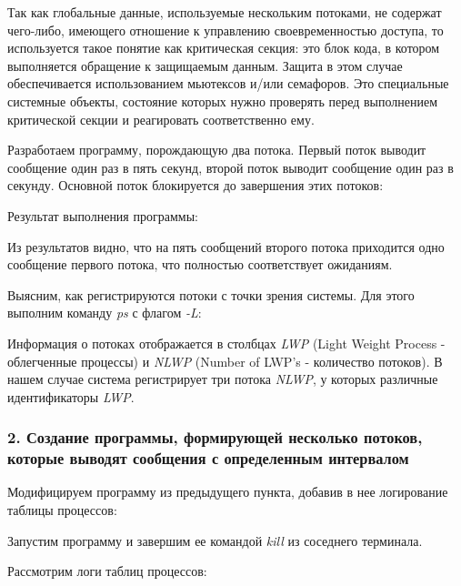 \documentclass[14pt,a4paper,report]{report}
\begin{document}
Так как глобальные данные, используемые нескольким потоками, не содержат чего-либо, имеющего отношение к управлению своевременностью доступа, то используется такое понятие как критическая секция: это блок кода, в котором выполняется обращение к защищаемым данным. Защита в этом случае обеспечивается использованием мьютексов и/или семафоров. Это специальные системные объекты, состояние которых нужно проверять перед выполнением критической секции и реагировать соответственно ему.

Разработаем программу, порождающую два потока. Первый поток выводит сообщение один раз в пять секунд, второй поток выводит сообщение один раз в секунду. Основной поток блокируется до завершения этих потоков: 



Результат выполнения программы:



Из результатов видно, что на пять сообщений второго потока приходится одно сообщение первого потока, что полностью соответствует ожиданиям.

Выясним, как регистрируются потоки с точки зрения системы. Для этого выполним команду \emph{ps} с флагом \emph{-L}:



Информация о потоках отображается в столбцах \emph{LWP} (Light Weight Process - облегченные процессы) и \emph{NLWP} (Number of LWP's - количество потоков). В нашем случае система регистрирует три потока \emph{NLWP}, у которых различные идентификаторы \emph{LWP}.

\subsubsection{2. Создание программы, формирующей несколько потоков, которые выводят сообщения с определенным интервалом}

Модифицируем программу из предыдущего пункта, добавив в нее логирование таблицы процессов:



Запустим программу и завершим ее командой \emph{kill} из соседнего терминала.

Рассмотрим логи таблиц процессов:




\end{document}

